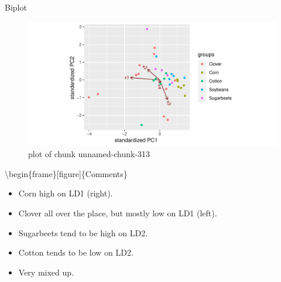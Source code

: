 \documentclass[ignorenonframetext,]{beamer}
\newenvironment{Shaded}{\begin{snugshade}}{\end{snugshade}}
\newcommand{\DataTypeTok}[1]{\textcolor[rgb]{0.13,0.29,0.53}{#1}}
\newcommand{\KeywordTok}[1]{\textcolor[rgb]{0.13,0.29,0.53}{\textbf{#1}}}
\newcommand{\NormalTok}[1]{#1}
\newcommand{\OperatorTok}[1]{\textcolor[rgb]{0.81,0.36,0.00}{\textbf{#1}}}
\begin{document}
\begin{frame}[fragile]{Biplot}
\protect\hypertarget{biplot}{}

\begin{Shaded}
\end{Shaded}

\begin{figure}
\centering
\includegraphics{figure/unnamed-chunk-313-1.pdf}
\caption{plot of chunk unnamed-chunk-313}
\end{figure}

\textbackslash{}begin\{frame\}{[}figure{]}\{Comments\}

\begin{itemize}
\item
  Corn high on LD1 (right).
\item
  Clover all over the place, but mostly low on LD1 (left).
\item
  Sugarbeets tend to be high on LD2.
\item
  Cotton tends to be low on LD2.
\item
  Very mixed up.
\end{itemize}

\end{frame}
\end{document}
